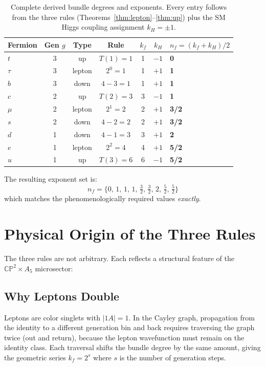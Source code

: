 \documentclass[11pt,a4paper]{article}
\newcommand{\CP}{\mathbb{CP}}
\theoremstyle{definition}
\theoremstyle{remark}
\begin{document}
\begin{table}[h]
\centering
\begin{tabular}{lcccccl}
\toprule
Fermion & Gen $g$ & Type & Rule & $k_f$ & $k_H$ & $n_f = (k_f+k_H)/2$ \\
\midrule
$t$ & 3 & up & $T(1) = 1$ & 1 & $-1$ & \textbf{0} \\
$\tau$ & 3 & lepton & $2^0 = 1$ & 1 & $+1$ & \textbf{1} \\
$b$ & 3 & down & $4-3 = 1$ & 1 & $+1$ & \textbf{1} \\
$c$ & 2 & up & $T(2) = 3$ & 3 & $-1$ & \textbf{1} \\
$\mu$ & 2 & lepton & $2^1 = 2$ & 2 & $+1$ & \textbf{3/2} \\
$s$ & 2 & down & $4-2 = 2$ & 2 & $+1$ & \textbf{3/2} \\
$d$ & 1 & down & $4-1 = 3$ & 3 & $+1$ & \textbf{2} \\
$e$ & 1 & lepton & $2^2 = 4$ & 4 & $+1$ & \textbf{5/2} \\
$u$ & 1 & up & $T(3) = 6$ & 6 & $-1$ & \textbf{5/2} \\
\bottomrule
\end{tabular}
\caption{Complete derived bundle degrees and exponents.  Every entry
follows from the three rules (Theorems~\ref{thm:lepton}--\ref{thm:up})
plus the SM Higgs coupling assignment $k_H = \pm 1$.}
\label{tab:complete}
\end{table}

The resulting exponent set is:
\[
n_f = \{0,\, 1,\, 1,\, 1,\, \tfrac{3}{2},\, \tfrac{3}{2},\, 2,\, \tfrac{5}{2},\, \tfrac{5}{2}\}
\]
which matches the phenomenologically required values \emph{exactly}.

\section{Physical Origin of the Three Rules}
\label{sec:origin}

The three rules are not arbitrary.  Each reflects a structural feature
of the $\CP^2 \times A_5$ microsector:

\subsection{Why Leptons Double}

Leptons are color singlets with $|1A| = 1$.  In the Cayley graph,
propagation from the identity to a different generation bin and back
requires traversing the graph twice (out and return), because the
lepton wavefunction must remain on the identity class.  Each traversal
shifts the bundle degree by the same amount, giving the geometric
series $k_f = 2^s$ where $s$ is the number of generation steps.
\end{document}
